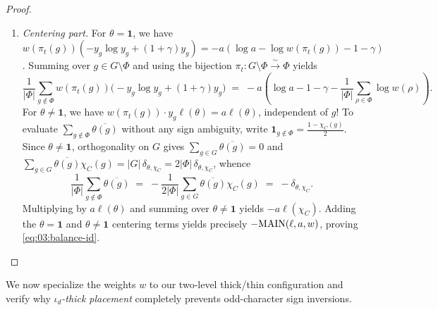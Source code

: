 \begin{proof}
\begin{enumerate}[label=(\arabic*)]
\item \emph{Centering part.} For $\theta = \mathbf{1}$, we have $w(\pi_t(g))(-y_g \log y_g + (1+\gamma)y_g) = -a(\log a - \log w(\pi_t(g)) - 1 - \gamma)$. Summing over $g \in G \setminus \Phi$ and using the bijection $\pi_t : G \setminus \Phi \xrightarrow{\sim} \Phi$ yields
  \[
    \frac{1}{|\Phi|}\sum_{g \notin \Phi} w(\pi_t(g))\bigl(-y_g\log y_g + (1+\gamma)y_g\bigr)
    \;=\; -a\!\left(\log a - 1 - \gamma - \frac{1}{|\Phi|}\sum_{\rho \in \Phi} \log w(\rho)\right).
  \]
  For $\theta \neq \mathbf{1}$, we have $w(\pi_t(g)) \cdot y_g \ell(\theta) = a \ell(\theta)$, independent of $g$! To evaluate $\sum_{g \notin \Phi} \overline{\theta(g)}$ without any sign ambiguity, write $\mathbf{1}_{g \notin \Phi} = \frac{1 - \chi_C(g)}{2}$. Since $\theta \neq \mathbf{1}$, orthogonality on $G$ gives $\sum_{g \in G} \overline{\theta(g)} = 0$ and $\sum_{g \in G} \overline{\theta(g)}\chi_C(g) = |G|\,\delta_{\theta, \chi_C} = 2|\Phi|\,\delta_{\theta, \chi_C}$, whence
  \[
    \frac{1}{|\Phi|}\sum_{g \notin \Phi} \overline{\theta(g)} \;=\; -\frac{1}{2|\Phi|}\sum_{g \in G} \overline{\theta(g)}\chi_C(g) \;=\; -\delta_{\theta, \chi_C}.
  \]
  Multiplying by $a\ell(\theta)$ and summing over $\theta \neq \mathbf{1}$ yields $-a\ell(\chi_C)$. Adding the $\theta = \mathbf{1}$ and $\theta \neq \mathbf{1}$ centering terms yields precisely $-\mathrm{MAIN}(\ell, a, w)$, proving \eqref{eq:03:balance-id}.
\end{enumerate}
\end{proof}

We now specialize the weights $w$ to our two-level thick/thin configuration and verify why \emph{$\iota_d$-thick placement} completely prevents odd-character sign inversions.

